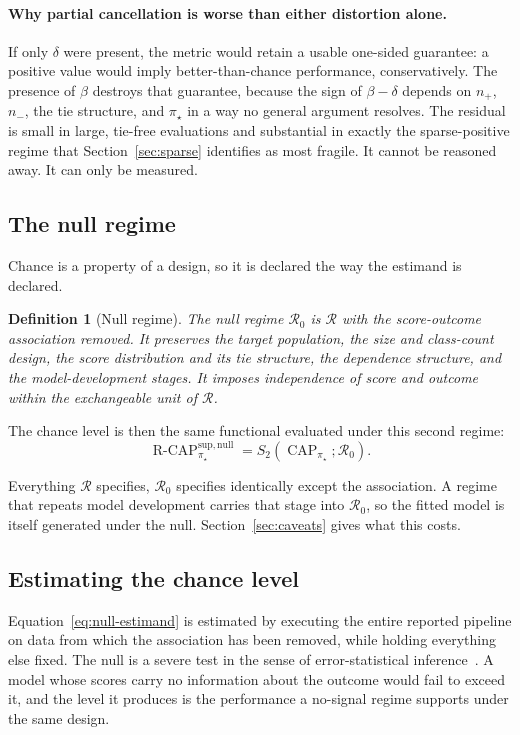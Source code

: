 \documentclass[11pt]{article}
\newcommand{\CAP}{\operatorname{CAP}}
\newcommand{\Regime}{\mathcal{R}}
\newcommand{\Tpi}{\CAP_{\pi_\star}}
\newcommand{\RCAPnull}{\operatorname{R\text{-}CAP}^{\mathrm{sup,null}}_{\pi_\star}}
\newcommand{\RegimeNull}{\Regime_{0}}
\newtheorem{definition}{Definition}
\theoremstyle{remark}
\begin{document}
\paragraph{Why partial cancellation is worse than either distortion alone.}
If only $\delta$ were present, the metric would retain a usable one-sided guarantee: a positive value would imply better-than-chance performance, conservatively. The presence of $\beta$ destroys that guarantee, because the sign of $\beta-\delta$ depends on $n_+$, $n_-$, the tie structure, and $\pi_\star$ in a way no general argument resolves. The residual is small in large, tie-free evaluations and substantial in exactly the sparse-positive regime that Section~\ref{sec:sparse} identifies as most fragile. It cannot be reasoned away. It can only be measured.

\subsection{The null regime}
\label{sec:null-regime}

Chance is a property of a design, so it is declared the way the estimand is declared.

\begin{definition}[Null regime]
The null regime $\RegimeNull$ is $\Regime$ with the score-outcome association removed. It preserves the target population, the size and class-count design, the score distribution and its tie structure, the dependence structure, and the model-development stages. It imposes independence of score and outcome within the exchangeable unit of $\Regime$.
\end{definition}

The chance level is then the same functional evaluated under this second regime:
\begin{equation}
\RCAPnull
=
S_2(\Tpi;\RegimeNull).
\label{eq:null-estimand}
\end{equation}

Everything $\Regime$ specifies, $\RegimeNull$ specifies identically except the association. A regime that repeats model development carries that stage into $\RegimeNull$, so the fitted model is itself generated under the null. Section~\ref{sec:caveats} gives what this costs.

\subsection{Estimating the chance level}

Equation~\eqref{eq:null-estimand} is estimated by executing the entire reported pipeline on data from which the association has been removed, while holding everything else fixed. The null is a severe test in the sense of error-statistical inference~\cite{mayo1996error}. A model whose scores carry no information about the outcome would fail to exceed it, and the level it produces is the performance a no-signal regime supports under the same design.
\end{document}
